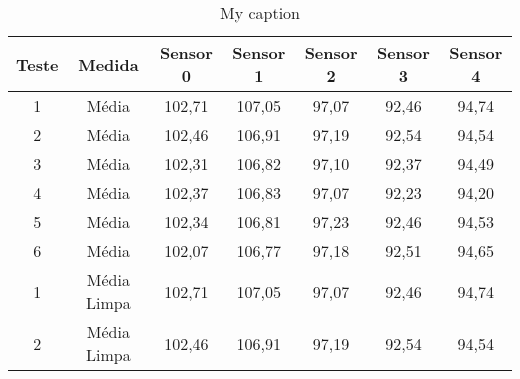 \begin{table}[]
\centering
\caption{My caption}
\label{my-label}
\begin{tabular}{|c|c|ccccc|}
\hline
\textbf{Teste}            & \textbf{Medida}                                                            & \textbf{Sensor 0}          & \textbf{Sensor 1}          & \textbf{Sensor 2}         & \textbf{Sensor 3}         & \textbf{Sensor 4}          \\ \hline
1                         & Média                                                                      & 102,71                     & 107,05                     & 97,07                     & 92,46                     & 94,74                      \\
2                         & Média                                                                      & 102,46                     & 106,91                     & 97,19                     & 92,54                     & 94,54                      \\
3                         & Média                                                                      & 102,31                     & 106,82                     & 97,10                     & 92,37                     & 94,49                      \\
4                         & Média                                                                      & 102,37                     & 106,83                     & 97,07                     & 92,23                     & 94,20                      \\
5                         & Média                                                                      & 102,34                     & 106,81                     & 97,23                     & 92,46                     & 94,53                      \\
6                         & Média                                                                      & 102,07                     & 106,77                     & 97,18                     & 92,51                     & 94,65                      \\ \hline
1                         & Média Limpa                                                                & 102,71                     & 107,05                     & 97,07                     & 92,46                     & 94,74                      \\
2                         & Média Limpa                                                                & 102,46                     & 106,91                     & 97,19                     & 92,54                     & 94,54                      \\

\end{tabular}
\end{table}
